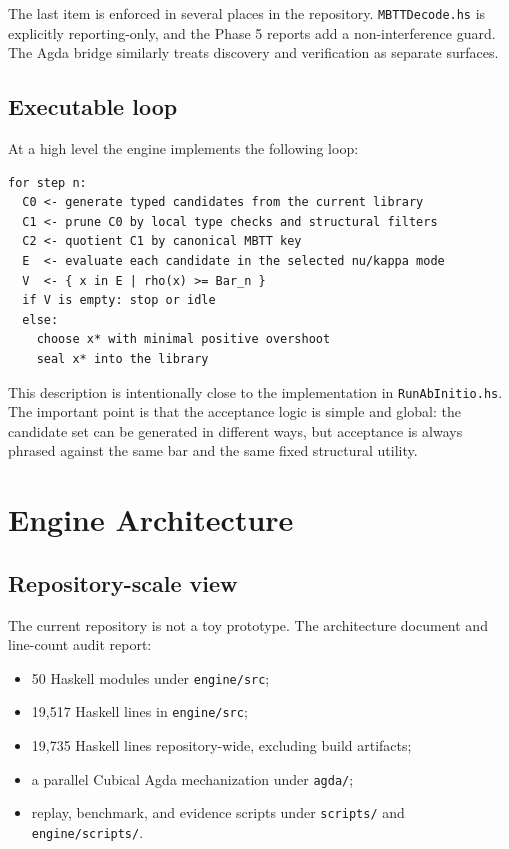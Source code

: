 \documentclass[11pt,a4paper]{article}
\begin{document}
The last item is enforced in several places in the repository. \texttt{MBTTDecode.hs} is explicitly reporting-only, and the Phase 5 reports add a non-interference guard. The Agda bridge similarly treats discovery and verification as separate surfaces.

\subsection{Executable loop}

At a high level the engine implements the following loop:

\begin{verbatim}
for step n:
  C0 <- generate typed candidates from the current library
  C1 <- prune C0 by local type checks and structural filters
  C2 <- quotient C1 by canonical MBTT key
  E  <- evaluate each candidate in the selected nu/kappa mode
  V  <- { x in E | rho(x) >= Bar_n }
  if V is empty: stop or idle
  else:
    choose x* with minimal positive overshoot
    seal x* into the library
\end{verbatim}

This description is intentionally close to the implementation in \texttt{RunAbInitio.hs}. The important point is that the acceptance logic is simple and global: the candidate set can be generated in different ways, but acceptance is always phrased against the same bar and the same fixed structural utility.

\section{Engine Architecture}
\label{sec:architecture}

\subsection{Repository-scale view}

The current repository is not a toy prototype. The architecture document and line-count audit report:
\begin{itemize}[nosep]
  \item 50 Haskell modules under \texttt{engine/src};
  \item 19{,}517 Haskell lines in \texttt{engine/src};
  \item 19{,}735 Haskell lines repository-wide, excluding build artifacts;
  \item a parallel Cubical Agda mechanization under \texttt{agda/};
  \item replay, benchmark, and evidence scripts under \texttt{scripts/} and \texttt{engine/scripts/}.
\end{itemize}
\end{document}
